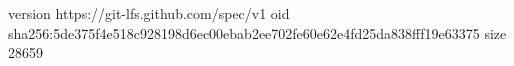 version https://git-lfs.github.com/spec/v1
oid sha256:5de375f4e518c928198d6ec00ebab2ee702fe60e62e4fd25da838fff19e63375
size 28659
